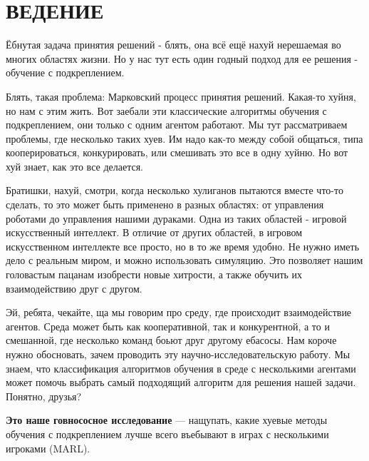 \chapter*{\hfill{\centering ВЕДЕНИЕ }\hfill}


Ёбнутая задача принятия решений - блять, она всё ещё нахуй нерешаемая во многих областях жизни.
Но у нас тут есть один годный подход для ее решения - обучение с подкреплением.

Блять, такая проблема: Марковский процесс принятия решений. Какая-то хуйня, но нам с этим жить. Вот заебали эти классические алгоритмы обучения с подкреплением, они только с одним агентом работают. Мы тут рассматриваем проблемы, где несколько таких хуев. Им надо как-то между собой общаться, типа кооперироваться, конкурировать, или смешивать это все в одну хуйню. Но вот хуй знает, как это все делается.

Братишки, нахуй, смотри, когда несколько хулиганов пытаются вместе что-то сделать, то это может быть применено в разных областях: от управления роботами до управления нашими дураками. Одна из таких областей - игровой искусственный интеллект. В отличие от других областей, в игровом искусственном интеллекте все просто, но в то же время удобно. Не нужно иметь дело с реальным миром, и можно использовать симуляцию. Это позволяет нашим головастым пацанам изобрести новые хитрости, а также обучить их взаимодействию друг с другом.

Эй, ребята, чекайте, ща мы говорим про среду, где происходит взаимодействие агентов. Среда может быть как кооперативной, так и конкурентной, а то и смешанной, где несколько команд боьют друг другому ебасосы. Нам короче нужно обосновать, зачем проводить эту научно-исследовательскую работу. Мы знаем, что классификация алгоритмов обучения в среде с несколькими агентами может помочь выбрать самый подходящий алгоритм для решения нашей задачи. Понятно, друзья?



\textbf{Это наше говнососное исследование} --- нащупать, какие хуевые методы обучения с подкреплением лучше всего въебывают в играх с несколькими игроками (MARL).

